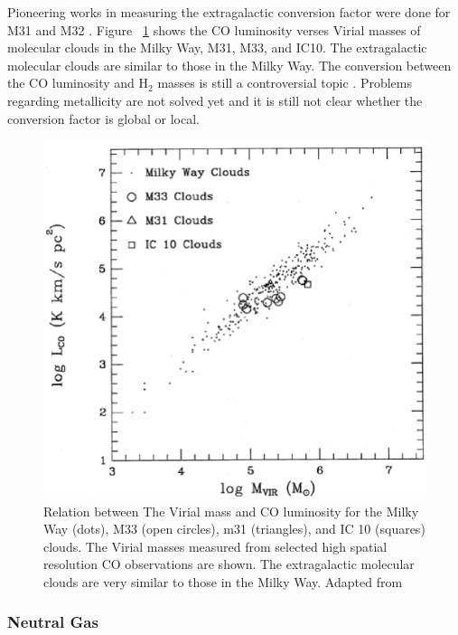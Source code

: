 Pioneering works in measuring the extragalactic conversion factor were done for M31 and M32 \citep[e.g.,][]{Wilson89, Wilson90}. Figure {~\ref{fig: mco}} shows the CO luminosity verses Virial masses of molecular clouds in the Milky Way, M31, M33, and IC10. The extragalactic molecular clouds are similar to those in the Milky Way. The conversion between the CO luminosity and H$_2$ masses is still a controversial topic \citep[e.g.][]{Narayanan11, Bolato13, Sandstrom13}. Problems regarding metallicity are not solved yet and it is still not clear whether the conversion factor is global or local. 

\begin{figure}
\label{fig: mco}
\centering
\includegraphics[width=16cm]{../image_intro/mvirial_lco.eps}
\caption{Relation between The Virial mass and CO luminosity for the Milky Way (dots), M33 (open circles), m31 (triangles), and IC 10 (squares) clouds. The Virial masses measured from selected high spatial resolution CO observations are shown. The extragalactic molecular clouds are very similar to those in the Milky Way. Adapted from \cite{Young91}}
\end{figure}
 

\subsubsection*{Neutral Gas}

